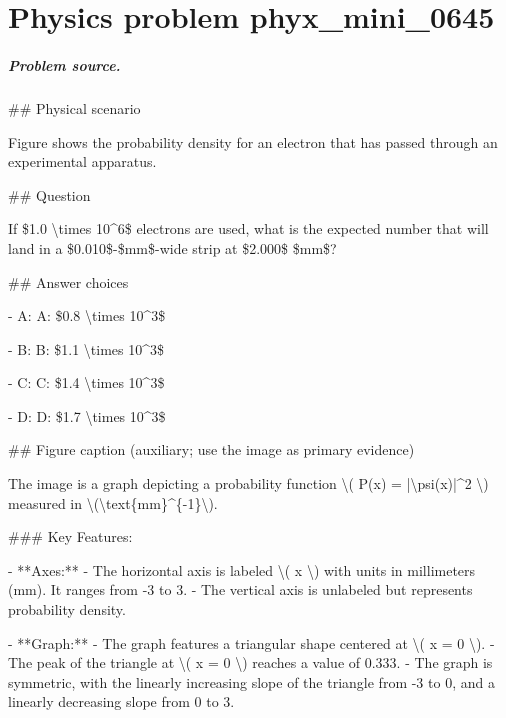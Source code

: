 
\chapter{Physics problem phyx\_mini\_0645}
\label{ch:PhyXMiniProblems_problem_phyx_mini_0645}

\paragraph{Problem source.}
\#\# Physical scenario

Figure shows the probability density for an electron that has passed through an experimental apparatus.

\#\# Question

If \$1.0 \textbackslash{}times 10\textasciicircum{}6\$ electrons are used, what is the expected number that will land in a \$0.010\$-\$mm\$-wide strip at \$2.000\$ \$mm\$?

\#\# Answer choices

- A: A: \$0.8 \textbackslash{}times 10\textasciicircum{}3\$

- B: B: \$1.1 \textbackslash{}times 10\textasciicircum{}3\$

- C: C: \$1.4 \textbackslash{}times 10\textasciicircum{}3\$

- D: D: \$1.7 \textbackslash{}times 10\textasciicircum{}3\$

\#\# Figure caption (auxiliary; use the image as primary evidence)

The image is a graph depicting a probability function \textbackslash{}( P(x) = |\textbackslash{}psi(x)|\textasciicircum{}2 \textbackslash{}) measured in \textbackslash{}(\textbackslash{}text\{mm\}\textasciicircum{}\{-1\}\textbackslash{}). 

\#\#\# Key Features:

- **Axes:**
  - The horizontal axis is labeled \textbackslash{}( x \textbackslash{}) with units in millimeters (mm). It ranges from -3 to 3.
  - The vertical axis is unlabeled but represents probability density.

- **Graph:**
  - The graph features a triangular shape centered at \textbackslash{}( x = 0 \textbackslash{}).
  - The peak of the triangle at \textbackslash{}( x = 0 \textbackslash{}) reaches a value of 0.333.
  - The graph is symmetric, with the linearly increasing slope of the triangle from -3 to 0, and a linearly decreasing slope from 0 to 3.

